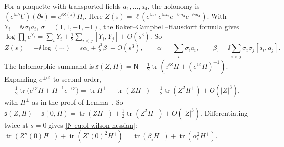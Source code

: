 \begin{step}
For a plaquette with transported fields $a_1,\dots,a_4$, the holonomy is $(e^{\ii sh}U)(\partial\square)=e^{\ii Z(s)}H_\square$. Here $Z(s)=\ell(e^{\ii sa_1}e^{\ii sa_2}e^{-\ii sa_3}e^{-\ii sa_4})$. With $Y_i=\ii s\sigma_ia_i$, $\sigma=(1,1,-1,-1)$, the Baker--Campbell--Hausdorff formula gives $\log\prod_ie^{Y_i}=\sum_iY_i+\frac12\sum_{i<j}[Y_i,Y_j]+O(s^3)$. So
\[
Z(s)=-\ii\log(\cdots)=s\alpha_\square+\tfrac{s^2}2\beta_\square+O(s^3),\qquad\alpha_\square=\sum_i\sigma_ia_i,\qquad\beta_\square=\ii\sum_{i<j}\sigma_i\sigma_j[a_i,a_j].
\]
The holomorphic summand is $\mathfrak s(Z,H)=\mathsf N-\frac12\operatorname{tr}(e^{\ii Z}H+(e^{\ii Z}H)^{-1})$. Expanding $e^{\pm\ii Z}$ to second order,
\[
\tfrac12\operatorname{tr}\big(e^{\ii Z}H+H^{-1}e^{-\ii Z}\big)=\operatorname{tr}H^+-\operatorname{tr}(ZH^-)-\tfrac12\operatorname{tr}(Z^2H^+)+O(|Z|^3),
\]
with $H^\pm$ as in the proof of Lemma~. So $\mathfrak s(Z,H)-\mathfrak s(0,H)=\operatorname{tr}(ZH^-)+\frac12\operatorname{tr}(Z^2H^+)+O(|Z|^3)$. Differentiating twice at $s=0$ gives \eqref{N-eq:ol-wilson-hessian}: $\operatorname{tr}(Z''(0)H^-)+\operatorname{tr}(Z'(0)^2H^+)=\operatorname{tr}(\beta_\square H^-)+\operatorname{tr}(\alpha_\square^2H^+)$.
\end{step}

